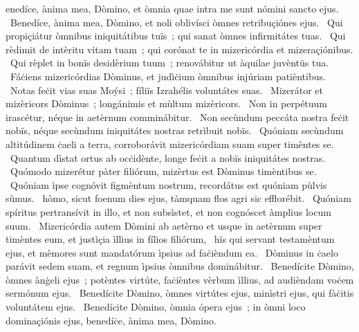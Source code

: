 { }
{%
enedíce, ànima mea, Dòmino, et òmnia quae intra me sunt nómini sancto ejus. 
~Benedíce, ànima mea, Dòmino, et noli oblivísci òmnes retribuçiónes ejus. 
~Qui propiçiátur òmnibus iniquitátibus tuïs~; qui sanat òmnes infirmitátes tuas. 
~Qui rèdimit de intèritu vitam tuam~; qui corónat te in mizericórdia et mizeraçiónibus. 
~Qui rèplet in bonïs desidèrium tuum~; renovábitur ut àquilae juvèntüs tua. 
~Fáċiens mizericórdias Dòminus, et judìċium òmnibus injúriam patièntibus. 
~Notas feċit vias suas Moýsi~; fíliïs Izrahélis voluntátes suas. 
~Mizerátor et mizèricors Dòminus~; longánimis et mùltum mizèricors. 
~Non in perpétuum irascétur, néque in aetèrnum comminábitur. 
~Non secùndum peccáta nostra feċit nobïs, néque secùndum iniquitátes nostras retrìbuit nobïs. 
~Quóniam secùndum altitúdinem ċaeli a terra, corroborávit mizericórdiam suam super timèntes se. 
~Quantum dìstat ortus ab ocċidènte, longe feċit a nobïs iniquitátes nostras. 
~Quómodo mizerétur pàter filiórum, mizèrtus est Dòminus timèntibus se. 
~Quóniam ìpse cognóvit figmèntum nostrum, recordátus est quóniam pùlvis sùmus. 
~hòmo, sicut foenum dies ejus, tàmquam flos agri sic efflorébit. 
~Quóniam spíritus pertransívit in illo, et non subsìstet, et non cognóscet àmplius locum suum. 
~Mizericórdia autem Dòmini ab aetèrno et usque in aetèrnum super timèntes eum, et justìçia ìllius in fílios filiórum, 
~hïs qui servant testamèntum ejus, et mèmores sunt mandatórum ìpsius ad faċièndum ea. 
~Dòminus in ċaelo parávit sedem suam, et regnum ìpsius òmnibus dominábitur. 
~Benedícite Dòmino, òmnes ànġeli ejus~; potèntes virtúte, faċièntes vèrbum ìllius, ad audièndam voċem sermónum ejus. 
~Benedícite Dòmino, òmnes virtútes ejus, minìstri ejus, qui fàċitis voluntátem ejus. 
~Benedícite Dòmino, òmnia ópera ejus~; in òmni loco dominaçiónis ejus, benedíċe, ànima mea, Dòmino. 
}
